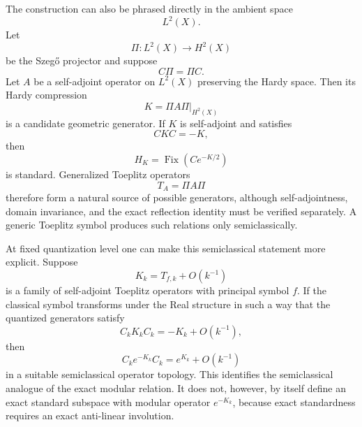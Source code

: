 \documentclass[a4paper,11pt]{article}
\theoremstyle{definition}
\begin{document}
The construction can also be phrased directly in the ambient space
\begin{equation}
    L^2(X).
\end{equation}
Let
\begin{equation}
    \Pi:L^2(X)\rightarrow H^2(X)
\end{equation}
be the Szeg\H{o} projector and suppose
\begin{equation}
    C\Pi=\Pi C.
\end{equation}
Let $A$ be a self-adjoint operator on $L^2(X)$ preserving the Hardy space.
Then its Hardy compression
\begin{equation}
    K
    =
    \Pi A\Pi\big|_{H^2(X)}
\end{equation}
is a candidate geometric generator.  If $K$ is self-adjoint and satisfies
\begin{equation}
    CKC=-K,
\end{equation}
then
\begin{equation}
    H_K
    =
    \operatorname{Fix}
    \left(
    Ce^{-K/2}
    \right)
\end{equation}
is standard.  Generalized Toeplitz operators
\begin{equation}
    T_A=\Pi A\Pi
\end{equation}
therefore form a natural source of possible generators, although
self-adjointness, domain invariance, and the exact reflection identity must be
verified separately.  A generic Toeplitz symbol produces such relations only
semiclassically.

At fixed quantization level one can make this semiclassical statement more
explicit.  Suppose
\begin{equation}
    K_k=T_{f,k}+O(k^{-1})
\end{equation}
is a family of self-adjoint Toeplitz operators with principal symbol $f$.
If the classical symbol transforms under the Real structure in such a way
that the quantized generators satisfy
\begin{equation}
    C_kK_kC_k
    =
    -K_k+O(k^{-1}),
\end{equation}
then
\begin{equation}
    C_ke^{-K_k}C_k
    =
    e^{K_k}+O(k^{-1})
\end{equation}
in a suitable semiclassical operator topology.  This identifies the
semiclassical analogue of the exact modular relation.  It does not, however,
by itself define an exact standard subspace with modular operator $e^{-K_k}$,
because exact standardness requires an exact anti-linear involution.
\end{document}

